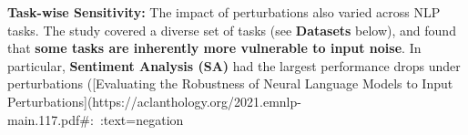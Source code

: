 \textbf{Task-wise Sensitivity:} The impact of perturbations also varied across NLP tasks. The study covered a diverse set of tasks (see \textbf{Datasets} below), and found that \textbf{some tasks are inherently more vulnerable to input noise}. In particular, \textbf{Sentiment Analysis (SA)} had the largest performance drops under perturbations ([Evaluating the Robustness of Neural Language Models to Input Perturbations](https://aclanthology.org/2021.emnlp-main.117.pdf#:~:text=negation%